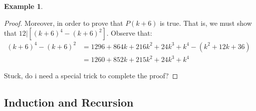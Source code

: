 \documentclass{book}
\theoremstyle{definition}
\newtheorem{example}{Example}[definition]
\theoremstyle{remark}
\begin{document}
\begin{example}
\begin{proof}
    Moreover, in order to prove that $P(k+6)$ is true. That is, we must show that $12 | [(k+6)^4 - (k+6)^2] $. Observe that: 
        \begin{align*}
            (k+6)^4 - (k+6)^2 & = 1296 + 864k + 216k^2 + 24k^3 + k^4 - (k^2 + 12 k + 36) \\
                & = 1260 + 852k + 215k^2 + 24k^3 + k^4
        \end{align*}
    
Stuck, do i need a special trick to complete the proof?  
    
    
 
\end{proof}
\end{example}







\newpage
\subsection{Induction and Recursion}
\end{document}
